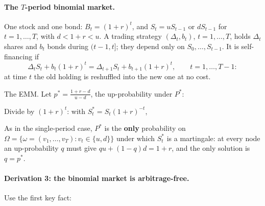 \begin{problem}[Q2(c)]
\paragraph{The $T$-period binomial market.} One stock and one bond: $B_t=(1+r)^t$, and $S_t=uS_{t-1}$ or $dS_{t-1}$ for $t=1,\dots,T$, with $d<1+r<u$. A trading strategy $(\Delta_t,b_t)$, $t=1,\dots,T$, holds $\Delta_t$ shares and $b_t$ bonds during $(t-1,t]$; they depend only on $S_0,\dots,S_{t-1}$. It is self-financing if
\[
\Delta_tS_t+b_t(1+r)^t=\Delta_{t+1}S_t+b_{t+1}(1+r)^t,\qquad t=1,\dots,T-1:
\]
at time $t$ the old holding is reshuffled into the new one at no cost.
\begin{steps}[resume]
\item The EMM. Let $p^*=\frac{1+r-d}{u-d}$, the up-probability under $P^*$:
\begin{deriv}
\end{deriv}
\item Divide by $(1+r)^t$: with $S^*_t=S_t(1+r)^{-t}$,
\begin{deriv}
\end{deriv}
As in the single-period case, $P^*$ is the \textbf{only} probability on $\Omega=\{\omega=(v_1,\dots,v_T):v_t\in\{u,d\}\}$ under which $S^*_t$ is a martingale: at every node an up-probability $q$ must give $qu+(1-q)d=1+r$, and the only solution is $q=p^*$.
\end{steps}

\paragraph{Derivation 3: the binomial market is arbitrage-free.}
\begin{steps}[resume]
\item Use the first key fact:
\begin{deriv}
\end{deriv}
\end{steps}


\end{problem}
